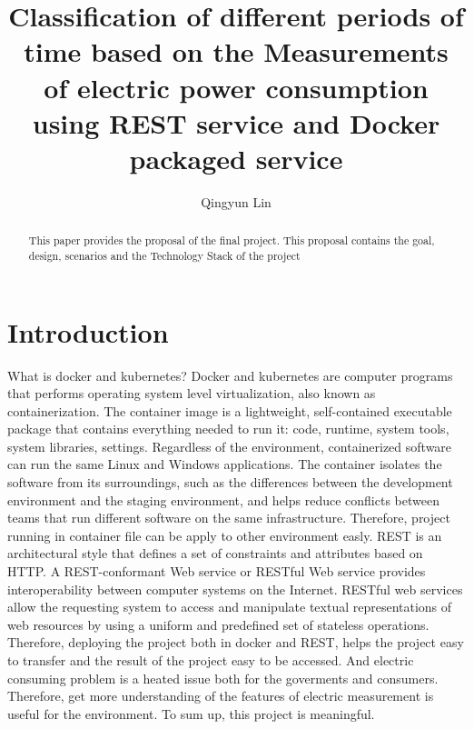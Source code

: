 
\title{Classification of different periods of time based on the Measurements of electric power consumption using REST service and Docker packaged service}


\author{Qingyun Lin}


\renewcommand{\shortauthors}{G. v. Laszewski}


\begin{abstract}
This paper provides the proposal of the final project. This proposal contains the goal, design, scenarios and the Technology Stack of the project
\end{abstract}



\maketitle

\section{Introduction}

What is docker and kubernetes? Docker and kubernetes are computer programs that performs operating system level virtualization, also known as containerization. The container image is a lightweight, self-contained executable package that contains everything needed to run it: code, runtime, system tools, system libraries, settings. Regardless of the environment, containerized software can run the same Linux and Windows applications. The container isolates the software from its surroundings, such as the differences between the development environment and the staging environment, and helps reduce conflicts between teams that run different software on the same infrastructure. Therefore, project running in container file can be apply to other environment easly. REST is an architectural style that defines a set of constraints and attributes based on HTTP. A REST-conformant Web service or RESTful Web service provides interoperability between computer systems on the Internet. RESTful web services allow the requesting system to access and manipulate textual representations of web resources by using a uniform and predefined set of stateless operations. Therefore, deploying the project both in docker and REST, helps the project easy to transfer and the result of the project easy to be accessed. And electric consuming problem is a heated issue both for the goverments and consumers. Therefore, get more understanding of the features of electric measurement is useful for the environment. To sum up, this project is meaningful.


